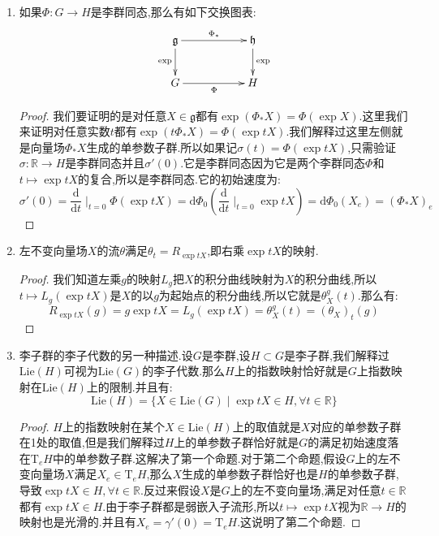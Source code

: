 \begin{enumerate}
\begin{proof}
    	任取$X\in\mathfrak{g}$,考虑曲线$\sigma:\mathbb{R}\to\mathfrak{g}$为$t\mapsto tX$,那么$\sigma'(0)=X$.于是有:
    	$$(\mathrm{d}\exp)_0(X_e)=(\mathrm{d}\exp)_0(\sigma'(0))=(\exp\circ\sigma)'(0)=\frac{\mathrm{d}}{\mathrm{d}t}\mid_{t=0}\exp tX=\gamma'(0)=X_e$$
    \end{proof}
    \item 如果$\Phi:G\to H$是李群同态,那么有如下交换图表:
    $$\xymatrix{\mathfrak{g}\ar[rr]^{\Phi_*}\ar[d]_{\exp}&&\mathfrak{h}\ar[d]^{\exp}\\G\ar[rr]_{\Phi}&&H}$$
    \begin{proof}
    	
    	我们要证明的是对任意$X\in\mathfrak{g}$都有$\exp(\Phi_*X)=\Phi(\exp X)$.这里我们来证明对任意实数$t$都有$\exp(t\Phi_*X)=\Phi(\exp tX)$.我们解释过这里左侧就是向量场$\Phi_*X$生成的单参数子群.所以如果记$\sigma(t)=\Phi(\exp tX)$,只需验证$\sigma:\mathbb{R}\to H$是李群同态并且$\sigma'(0)$.它是李群同态因为它是两个李群同态$\Phi$和$t\mapsto\exp tX$的复合,所以是李群同态.它的初始速度为:
    	$$\sigma'(0)=\frac{\mathrm{d}}{\mathrm{d}t}\mid_{t=0}\Phi(\exp tX)=\mathrm{d}\Phi_0\left(\frac{\mathrm{d}}{\mathrm{d}t}\mid_{t=0}\exp tX\right)=\mathrm{d}\Phi_0(X_e)=(\Phi_*X)_e$$
    \end{proof}
    \item 左不变向量场$X$的流$\theta$满足$\theta_t=R_{\exp tX}$,即右乘$\exp tX$的映射.
    \begin{proof}
    	
    	我们知道左乘$g$的映射$L_g$把$X$的积分曲线映射为$X$的积分曲线,所以$t\mapsto L_g(\exp tX)$是$X$的以$g$为起始点的积分曲线,所以它就是$\theta_X^g(t)$.那么有:
    	$$R_{\exp tX}(g)=g\exp tX=L_g(\exp tX)=\theta_X^g(t)=(\theta_X)_t(g)$$
    \end{proof}
    \item 李子群的李子代数的另一种描述.设$G$是李群,设$H\subset G$是李子群,我们解释过$\mathrm{Lie}(H)$可视为$\mathrm{Lie}(G)$的李子代数.那么$H$上的指数映射恰好就是$G$上指数映射在$\mathrm{Lie}(H)$上的限制.并且有:$$\mathrm{Lie}(H)=\{X\in\mathrm{Lie}(G)\mid\exp tX\in H,\forall t\in\mathbb{R}\}$$
    \begin{proof}
    	
    	$H$上的指数映射在某个$X\in\mathrm{Lie}(H)$上的取值就是$X$对应的单参数子群在1处的取值,但是我们解释过$H$上的单参数子群恰好就是$G$的满足初始速度落在$\mathrm{T}_eH$中的单参数子群.这解决了第一个命题.对于第二个命题,假设$G$上的左不变向量场$X$满足$X_e\in\mathrm{T}_eH$,那么$X$生成的单参数子群恰好也是$H$的单参数子群,导致$\exp tX\in H,\forall t\in\mathbb{R}$.反过来假设$X$是$G$上的左不变向量场,满足对任意$t\in\mathbb{R}$都有$\exp tX\in H$.由于李子群都是弱嵌入子流形,所以$t\mapsto\exp tX$视为$\mathbb{R}\to H$的映射也是光滑的.并且有$X_e=\gamma'(0)=\mathrm{T}_eH$.这说明了第二个命题.
    \end{proof}
\end{enumerate}

